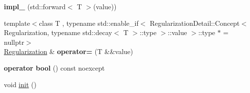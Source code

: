 \begin{DoxyCompactItemize}
\item 
\hypertarget{classSpacy_1_1CG_1_1Regularization_ae3d68063308c242279d2f89d2485379e}{{\bfseries impl\-\_\-} (std\-::forward$<$ T $>$(value))}\label{classSpacy_1_1CG_1_1Regularization_ae3d68063308c242279d2f89d2485379e}

\item 
\hypertarget{classSpacy_1_1CG_1_1Regularization_a87bc2ab43e1a8a1d7ac50161ee23fe53}{{\footnotesize template$<$class T , typename std\-::enable\-\_\-if$<$ Regularization\-Detail\-::\-Concept$<$ Regularization, typename std\-::decay$<$ T $>$\-::type $>$\-::value $>$\-::type $\ast$  = nullptr$>$ }\\\hyperlink{classSpacy_1_1CG_1_1Regularization}{Regularization} \& {\bfseries operator=} (T \&\&value)}\label{classSpacy_1_1CG_1_1Regularization_a87bc2ab43e1a8a1d7ac50161ee23fe53}

\item 
\hypertarget{classSpacy_1_1CG_1_1Regularization_a86442555cec865ec4096c34d5b009167}{{\bfseries operator bool} () const noexcept}\label{classSpacy_1_1CG_1_1Regularization_a86442555cec865ec4096c34d5b009167}

\item 
\hypertarget{classSpacy_1_1CG_1_1Regularization_a0a92edab4bf50bd27bc549311c736cd5}{void \hyperlink{classSpacy_1_1CG_1_1Regularization_a0a92edab4bf50bd27bc549311c736cd5}{init} ()}\label{classSpacy_1_1CG_1_1Regularization_a0a92edab4bf50bd27bc549311c736cd5}


\end{DoxyCompactItemize}
